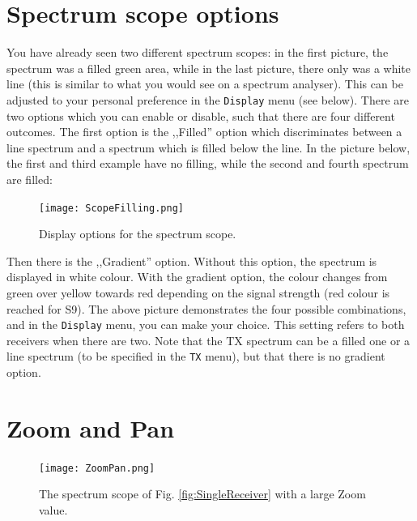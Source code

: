 \documentclass[12pt]{book}
\def\bltt#1{\texttt{\color{blue}#1}}
\begin{document}
\section{Spectrum scope options}
\label{sec:FillingGradient}

You have already seen two different spectrum scopes: in the first
picture, the  spectrum was a filled green area, while in the last
picture, there only was a white line (this is similar to what you
would see on a spectrum analyser). This can be adjusted to your
personal preference in the \bltt{Display} menu (see below). There
are two options which you can enable or disable, such that there
are four different outcomes. The first option is the ,,Filled'' option
which discriminates between a line spectrum and a spectrum which is
filled below the line. In the picture below, the first and third
example have no filling, while the second and fourth spectrum
are filled:

\begin{figure}[ht]
\center
\texttt{[image: ScopeFilling.png]}
\caption{Display options for the spectrum scope.}
\end{figure}

Then there is the ,,Gradient'' option. Without this option, the
spectrum is displayed in white colour. With the gradient option,
the colour changes from green over yellow towards red depending
on the signal strength (red colour is reached for S9). The above
picture demonstrates the four possible combinations, and in
the \bltt{Display} menu, you can make your choice. This setting
refers to both receivers when there are two. Note that the TX
spectrum can be a filled one or a line spectrum (to be specified
in the \bltt{TX} menu), but that there
is no gradient option.

\section{Zoom and Pan}
\label{sec:ZoomPanArea}

\begin{figure}[ht]
\center
\texttt{[image: ZoomPan.png]}
\caption{The spectrum scope of Fig. \ref{fig:SingleReceiver} with a
large Zoom value.}
\end{figure}
\end{document}
